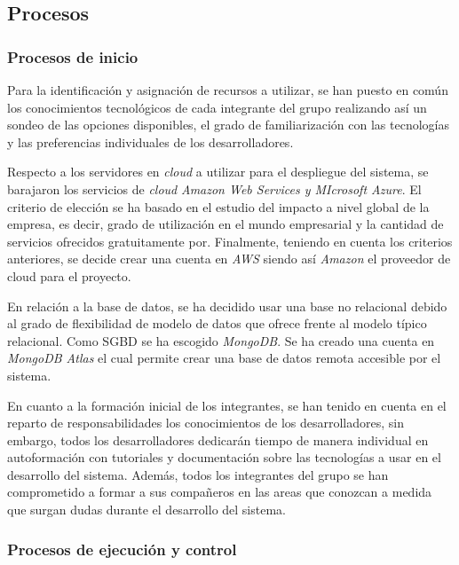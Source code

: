 \documentclass{article}
\begin{document}
\subsection{Procesos}

\subsubsection{Procesos de inicio}

Para la identificación y asignación de recursos a utilizar, se han puesto en común los conocimientos
tecnológicos de cada integrante del grupo realizando así un sondeo de las opciones disponibles, el 
grado de familiarización con las tecnologías y las preferencias individuales de los desarrolladores. 

Respecto a los servidores en \textit{cloud} a utilizar para el despliegue del sistema, se barajaron
los servicios de \textit{cloud} \textit{Amazon Web Services y MIcrosoft Azure}.
El criterio de elección se ha basado en el estudio del impacto a nivel global de la empresa, es decir,
grado de utilización en el mundo empresarial y la cantidad de servicios ofrecidos gratuitamente por.
Finalmente, teniendo en cuenta los criterios anteriores, se decide crear una cuenta en \textit{AWS} 
siendo así \textit{Amazon} el proveedor de cloud para el proyecto.

\pagebreak
En relación a la base de datos, se ha decidido usar una base no relacional debido al grado de flexibilidad
de modelo de datos que ofrece frente al modelo típico relacional. Como SGBD se ha escogido \textit{MongoDB}.
Se ha creado una cuenta en \textit{MongoDB Atlas} el cual permite crear una base de datos remota accesible
por el sistema.

En cuanto a la formación inicial de los integrantes, se han tenido en cuenta en el reparto de responsabilidades 
los conocimientos de los desarrolladores, sin embargo, todos los desarrolladores dedicarán tiempo de manera individual 
en autoformación con tutoriales y documentación sobre las tecnologías a usar en el desarrollo del sistema.
Además, todos los integrantes del grupo se han comprometido a formar a sus compañeros en las areas que conozcan
a medida que surgan dudas durante el desarrollo del sistema.


\subsubsection{Procesos de ejecución y control}
\end{document}
